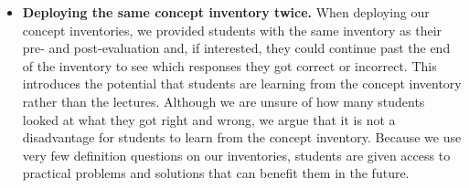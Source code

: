 \begin{itemize}
	\item \textbf{Deploying the same concept inventory twice.} When deploying our concept inventories, we provided students with the same inventory as their pre- and post-evaluation and, if interested, they could continue past the end of the inventory to see which responses they got correct or incorrect. This introduces the potential that students are learning from the concept inventory rather than the lectures. Although we are unsure of how many students looked at what they got right and wrong, we argue that it is not a disadvantage for students to learn from the concept inventory. Because we use very few definition questions on our inventories, students are given access to practical problems and solutions that can benefit them in the future. 
\end{itemize}